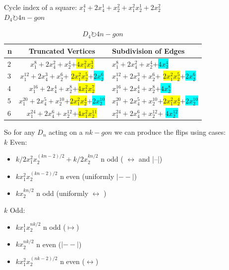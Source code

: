 \documentclass{beamer}
\begin{document}
\begin{frame}
Cycle index of a square:
$x_1^4+2x_4^1+x_2^2+x_1^2x_2^1+2x_2^2$\\

$D_4 \circlearrowright 4n-gon$\\

\begin{table}
\centering 
\begin{tabular}{l|c|l}
n & Truncated Vertices & Subdivision of Edges\\ \hline
2 & 
$x_1^8+2x_4^2+x_2^4$+\colorbox{yellow}{$4x_1^2x_2^3$} &
$x_1^8+2x_4^2+x_2^4$+\colorbox{cyan}{$4x_2^4$}\\
3 &
$x_1^{12} +2x_4^3+x_2^6$+ \colorbox{yellow}{$2x_1^2x_2^5$}+\colorbox{cyan}{$2x_2^6$} &
$x_1^{12} +2x_4^3+x_2^6$+ \colorbox{yellow}{$2x_1^2x_2^5$}+\colorbox{cyan}{$2x_2^6$}\\
4 &
$x_1^{16}+2x_4^4+x_2^8$+\colorbox{yellow}{$4x_1^2x_2^7$} &
$x_1^{16}+2x_4^4+x_2^8$+\colorbox{cyan}{$4x_2^8$}\\
5 &
$x_1^{20}+2x_4^5+x_2^{10}$+\colorbox{yellow}{$2x_1^2x_2^4$}+\colorbox{cyan}{$2x_2^{10}$} & 
$x_1^{20}+2x_4^5+x_2^{10}$+\colorbox{yellow}{$2x_1^2x_2^4$}+\colorbox{cyan}{$2x_2^{10}$}\\
6 & $x_1^{24}+2x_4^6+x_2^{12}$+\colorbox{yellow}{$4x_1^2x_2^{11}$} & $ x_1^24+2x_4^6+x_2^{12}$+ \colorbox{cyan}{$4x_2^{12}$}\\

\end{tabular}
\caption{$D_4 \circlearrowright 4n-gon$}
\end{table}
\end{frame}

\begin{frame}{}
So for any $D_n$ acting on a $nk-gon$ we can produce the flips using cases:\\
	 $k$ Even:\\
			\begin{itemize}
    			\item $k/2x_1^2x_2^{(kn-2)/2}+k/2x_2^{kn/2}$ n odd ( $\longleftrightarrow$ and |--|)
                \item $kx_1^2x_2^{(kn-2)/2}$ n even (uniformly $|--|$)
                \item $kx_2^{kn/2}$ n odd (uniformly $\longleftrightarrow$ )
             \end{itemize}
         $k$ Odd:\\
         	\begin{itemize}
            	\item $kx_1^1x_2^{nk/2}$ n odd ($\mapsto$)
                \item $kx_2^{nk/2}$ n even ($|--|$)
                \item $kx_1^2x_2^{(nk-2)/2}$ n even ($\longleftrightarrow$)
            \end{itemize}

\end{frame}
\end{document}

